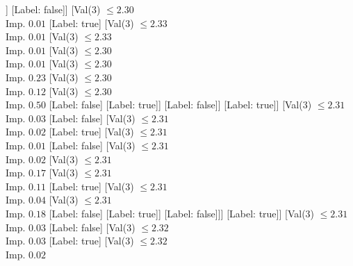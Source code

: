 \documentclass[margin=10pt]{standalone}
\begin{document}
\begin{forest}
													[Val($3$) $ \leq 2.30$ \\ Imp. $0.01$
														[Val($3$) $ \leq 2.30$ \\ Imp. $0.05$
															[Val($3$) $ \leq 2.30$ \\ Imp. $0.44$
																[Label: false]
																[Label: true]]
															[Label: false]]
														[Val($3$) $ \leq 2.30$ \\ Imp. $0.01$
															[Label: true]
															[Val($3$) $ \leq 2.33$ \\ Imp. $0.01$
																[Val($3$) $ \leq 2.33$ \\ Imp. $0.01$
																	[Val($3$) $ \leq 2.30$ \\ Imp. $0.01$
																		[Val($3$) $ \leq 2.30$ \\ Imp. $0.23$
																			[Val($3$) $ \leq 2.30$ \\ Imp. $0.12$
																				[Val($3$) $ \leq 2.30$ \\ Imp. $0.50$
																					[Label: false]
																					[Label: true]]
																				[Label: false]]
																			[Label: true]]
																		[Val($3$) $ \leq 2.31$ \\ Imp. $0.03$
																			[Label: false]
																			[Val($3$) $ \leq 2.31$ \\ Imp. $0.02$
																				[Label: true]
																				[Val($3$) $ \leq 2.31$ \\ Imp. $0.01$
																					[Label: false]
																					[Val($3$) $ \leq 2.31$ \\ Imp. $0.02$
																						[Val($3$) $ \leq 2.31$ \\ Imp. $0.17$
																							[Val($3$) $ \leq 2.31$ \\ Imp. $0.11$
																								[Label: true]
																								[Val($3$) $ \leq 2.31$ \\ Imp. $0.04$
																									[Val($3$) $ \leq 2.31$ \\ Imp. $0.18$
																										[Label: false]
																										[Label: true]]
																									[Label: false]]]
																							[Label: true]]
																						[Val($3$) $ \leq 2.31$ \\ Imp. $0.03$
																							[Label: false]
																							[Val($3$) $ \leq 2.32$ \\ Imp. $0.03$
																								[Label: true]
																								[Val($3$) $ \leq 2.32$ \\ Imp. $0.02$

\end{forest}
\end{document}
